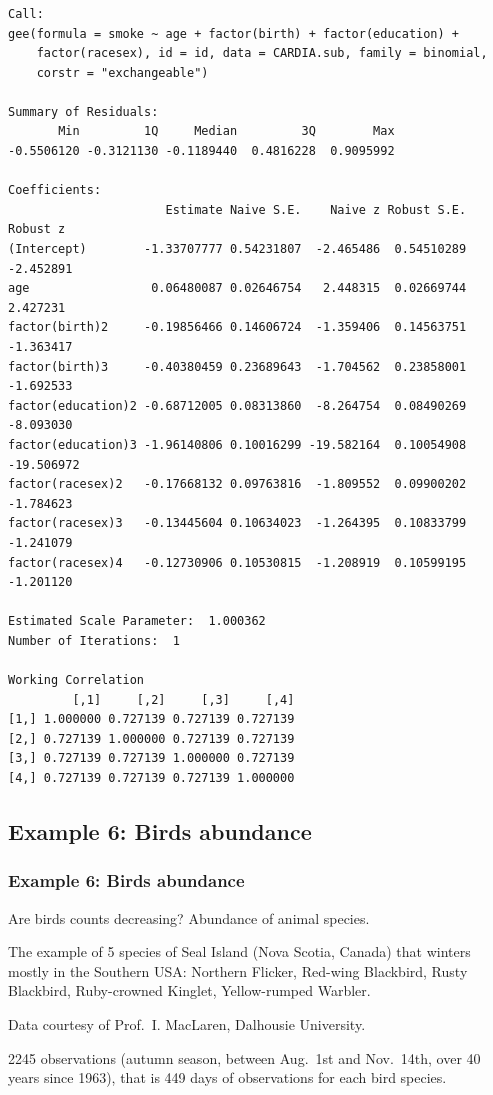 \documentclass{beamer}
\newcommand{\bs}{\bigskip}
\begin{document}
\begin{frame}[fragile]
\frametitle{}
{\tiny
\begin{verbatim}
Call:
gee(formula = smoke ~ age + factor(birth) + factor(education) + 
    factor(racesex), id = id, data = CARDIA.sub, family = binomial, 
    corstr = "exchangeable")

Summary of Residuals:
       Min         1Q     Median         3Q        Max 
-0.5506120 -0.3121130 -0.1189440  0.4816228  0.9095992 

Coefficients:
                      Estimate Naive S.E.    Naive z Robust S.E.   Robust z
(Intercept)        -1.33707777 0.54231807  -2.465486  0.54510289  -2.452891
age                 0.06480087 0.02646754   2.448315  0.02669744   2.427231
factor(birth)2     -0.19856466 0.14606724  -1.359406  0.14563751  -1.363417
factor(birth)3     -0.40380459 0.23689643  -1.704562  0.23858001  -1.692533
factor(education)2 -0.68712005 0.08313860  -8.264754  0.08490269  -8.093030
factor(education)3 -1.96140806 0.10016299 -19.582164  0.10054908 -19.506972
factor(racesex)2   -0.17668132 0.09763816  -1.809552  0.09900202  -1.784623
factor(racesex)3   -0.13445604 0.10634023  -1.264395  0.10833799  -1.241079
factor(racesex)4   -0.12730906 0.10530815  -1.208919  0.10599195  -1.201120

Estimated Scale Parameter:  1.000362
Number of Iterations:  1

Working Correlation
         [,1]     [,2]     [,3]     [,4]
[1,] 1.000000 0.727139 0.727139 0.727139
[2,] 0.727139 1.000000 0.727139 0.727139
[3,] 0.727139 0.727139 1.000000 0.727139
[4,] 0.727139 0.727139 0.727139 1.000000
\end{verbatim}
}
\end{frame}


\subsection{Example 6: Birds abundance}

\begin{frame}
\frametitle{Example 6: Birds abundance}


Are birds counts decreasing? Abundance of animal species.

\bs

The example of 5 species of Seal Island (Nova Scotia,
Canada) that winters mostly in the Southern USA: Northern Flicker, Red-wing Blackbird, Rusty Blackbird,
Ruby-crowned Kinglet, Yellow-rumped Warbler.

\bs

Data courtesy of Prof.\ I. MacLaren, Dalhousie University.


\bs

2245 observations (autumn season, between Aug.\ 1st and Nov.\ 14th, over 40 years
since 1963), that is 449 days of observations for each bird species.

\end{frame}
\end{document}
